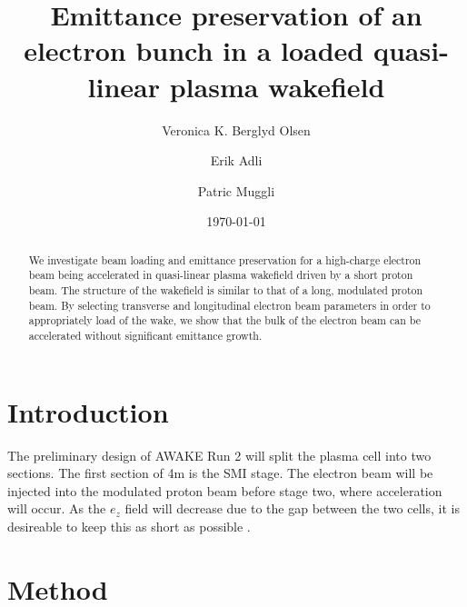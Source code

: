 \documentclass[aps,prstab,reprint,amsmath,amssymb,groupedaddress]{revtex4-1}
\begin{document}

\title{Emittance preservation of an electron bunch in a loaded quasi-linear plasma wakefield}

\author{Veronica K. Berglyd Olsen}

\author{Erik Adli}

\author{Patric Muggli}

\date{\today}

\begin{abstract}
We investigate beam loading and emittance preservation for a high-charge electron beam being accelerated in quasi-linear plasma wakefield driven by a short proton beam. The structure of the wakefield is similar to that of a long, modulated proton beam. By selecting transverse and longitudinal electron beam parameters in order to  appropriately load of the wake, we show that the bulk of the electron beam can be accelerated without significant emittance growth.
\end{abstract}

\maketitle

\section[\label{S:I}]{Introduction}


The preliminary design of AWAKE Run 2 will split the plasma cell into two sections. The first section of 4m is the SMI stage. The electron beam will be injected into the modulated proton beam before stage two, where acceleration will occur. As the $e_z$ field will decrease due to the gap between the two cells, it is desireable to keep this as short as possible \cite{adli:2016}.

\section[\label{S:M}]{Method}
\end{document}

